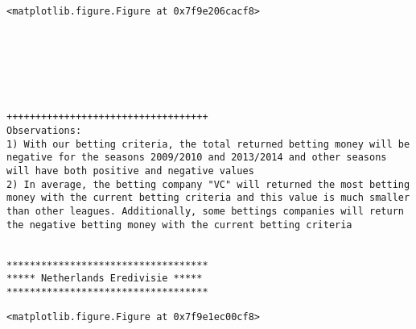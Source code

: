 \documentclass[11pt]{article}
\begin{document}
    
    \begin{verbatim}
<matplotlib.figure.Figure at 0x7f9e206cacf8>
    \end{verbatim}

    
    \begin{center}
    \end{center}
    { \hspace*{\fill} \\}
    
    \begin{center}
    \end{center}
    { \hspace*{\fill} \\}
    
    \begin{center}
    \end{center}
    { \hspace*{\fill} \\}
    
    \begin{Verbatim}[commandchars=\\\{\}]
+++++++++++++++++++++++++++++++++++
Observations: 
1) With our betting criteria, the total returned betting money will be negative for the seasons 2009/2010 and 2013/2014 and other seasons will have both positive and negative values
2) In average, the betting company "VC" will returned the most betting money with the current betting criteria and this value is much smaller than other leagues. Additionally, some bettings companies will return the negative betting money with the current betting criteria


***********************************
***** Netherlands Eredivisie *****
***********************************

    \end{Verbatim}

    
    \begin{verbatim}
<matplotlib.figure.Figure at 0x7f9e1ec00cf8>
    \end{verbatim}

    
    \begin{center}
    \end{center}
    { \hspace*{\fill} \\}
    
\end{document}
